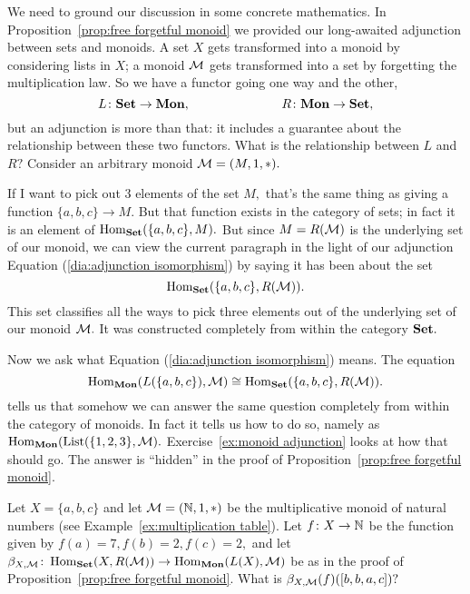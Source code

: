 \documentclass[CT4S-EN-RU]{subfiles}
\begin{document}
\begin{exampleENG}
We need to ground our discussion in some concrete mathematics. In Proposition~\ref{prop:free forgetful monoid} we provided our long-awaited adjunction between sets and monoids. A set $X$ gets transformed into a monoid by considering lists in $X$; a monoid $\mathcal{M}$ gets transformed into a set by forgetting the multiplication law. So we have a functor going one way and the other, 
$$L\colon{\mathbf{Set}}\rightarrow{\mathbf{Mon}},\hspace{1in}R\colon{\mathbf{Mon}}\rightarrow{\mathbf{Set}},$$
but an adjunction is more than that: it includes a guarantee about the relationship between these two functors. What is the relationship between $L$ and $R?$ Consider an arbitrary monoid $\mathcal{M}=(M,1,*).$

If I want to pick out 3 elements of the set $M,$ that's the same thing as giving a function $\{a,b,c\}\to M.$ But that function exists in the category of sets; in fact it is an element of $\operatorname{Hom}_{\mathbf{Set}}(\{a,b,c\},M).$ But since $M=R(\mathcal{M})$ is the underlying set of our monoid, we can view the current paragraph in the light of our adjunction Equation (\ref{dia:adjunction isomorphism}) by saying it has been about the set
$$\operatorname{Hom}_{\mathbf{Set}}(\{a,b,c\},R(\mathcal{M})).$$
This set classifies all the ways to pick three elements out of the underlying set of our monoid $\mathcal{M}.$ It was constructed completely from within the category ${\mathbf{Set}}.$

Now we ask what Equation (\ref{dia:adjunction isomorphism}) means. The equation
$$\operatorname{Hom}_{\mathbf{Mon}}(L(\{a,b,c\}),\mathcal{M})\cong\operatorname{Hom}_{\mathbf{Set}}(\{a,b,c\},R(\mathcal{M})).$$
tells us that somehow we can answer the same question completely from within the category of monoids. In fact it tells us how to do so, namely as $\operatorname{Hom}_{\mathbf{Mon}}(\operatorname{List}(\{1,2,3\},\mathcal{M}).$  Exercise~\ref{ex:monoid adjunction} looks at how that should go. The answer is “hidden” in the proof of Proposition~\ref{prop:free forgetful monoid}.
\end{exampleENG}

\begin{exampleRUS}
\end{exampleRUS}

\begin{exerciseENG}\label{ex:monoid adjunction}
Let $X=\{a,b,c\}$ and let $\mathcal{M}=({\mathbb N},1,*)$ be the multiplicative monoid of natural numbers (see Example~\ref{ex:multiplication table}). Let $f\colon X\rightarrow{\mathbb N}$ be the function given by $f(a)=7, f(b)=2, f(c)=2,$ and let $\beta_{X,\mathcal{M}}\colon\operatorname{Hom}_{\mathbf{Set}}(X,R(\mathcal{M}))\rightarrow\operatorname{Hom}_{\mathbf{Mon}}(L(X),\mathcal{M})$ be as in the proof of Proposition~\ref{prop:free forgetful monoid}. What is $\beta_{X,\mathcal{M}}(f)([b,b,a,c])?$
\end{exerciseENG}
\end{document}
